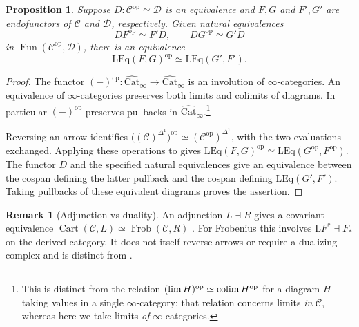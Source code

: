 \documentclass[11pt]{amsart}
\newcommand{\cC}{\mathcal{C}}
\newcommand{\cD}{\mathcal{D}}
\newcommand{\Cart}{\operatorname{Cart}}
\newcommand{\op}{{\operatorname{op}}}
\renewcommand{\lim}{\operatornamewithlimits{\rm{lim}}}
\newcommand{\colim}{\operatornamewithlimits{\rm{colim}}}
\DeclareMathOperator{\Fun}{\mathrm{Fun}}
\newcommand{\LEq}{\mathrm{LEq}}
\newcommand{\Catbig}{\widehat{\mathrm{Cat}}}
\newcommand{\Frob}{\operatorname{Frob}}
\theoremstyle{plain}
\newtheorem{proposition}[proposition]{Proposition}
\theoremstyle{definition}
\newtheorem{remark}[remark]{Remark}
\numberwithin{equation}{section}
\begin{document}
\begin{proposition}\label{prop:reversal}
Suppose $D:\cC^{\op}\simeq\cD$ is an equivalence and $F,G$ and $F',G'$ are endofunctors of $\cC$ and $\cD$, respectively.
Given natural equivalences
\[
 DF^{\op}\simeq F'D,\qquad DG^{\op}\simeq G'D
\]
in $\Fun(\cC^{\op},\cD)$, there is an equivalence
\[
 \LEq(F,G)^{\op}\simeq\LEq(G',F').
\]
\end{proposition}
\begin{proof}
The functor $(-)^{\op}:\Catbig_\infty\to\Catbig_\infty$ is an involution of $\infty$-categories.
An equivalence of $\infty$-categories preserves both limits and colimits of diagrams.
In particular $(-)^{\op}$ preserves pullbacks in $\Catbig_\infty$.\footnote{This is distinct from the relation $(\lim H)^{\op}\simeq\colim H^{\op}$ for a diagram $H$ taking values in a single $\infty$-category: that relation concerns limits \emph{in} $\cC$, whereas here we take limits \emph{of} $\infty$-categories.}

Reversing an arrow identifies
$\bigl((\cC)^{\Delta^1}\bigr)^{\op}\simeq(\cC^{\op})^{\Delta^1}$, with the two evaluations exchanged.
Applying these operations to  gives
$\LEq(F,G)^{\op}\simeq\LEq(G^{\op},F^{\op})$.
The functor $D$ and the specified natural equivalences give an equivalence between the cospan defining the latter pullback and the cospan defining $\LEq(G',F')$.
Taking pullbacks of these equivalent diagrams proves the assertion.
\end{proof}

\begin{remark}[Adjunction vs duality]
An adjunction $L\dashv R$ gives a covariant equivalence $\Cart(\cC,L)\simeq\Frob(\cC,R)$ \cite[Proposition 2.9; Corollary 2.10]{MWC}.
For Frobenius this involves $\mathrm LF^*\dashv F_*$ on the derived category.
It does not itself reverse arrows or require a dualizing complex and is distinct from .
\end{remark}
\end{document}
